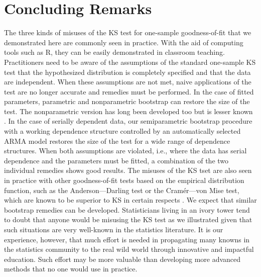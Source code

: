 \documentclass[12pt, letterpaper]{article}
\begin{document}
\section{Concluding Remarks}
\label{sec:conclusion}

The three kinds of misuses of the KS test for one-sample goodness-of-fit that we
demonstrated here are commonly seen in practice. With the aid of computing tools
such as R, they can be easily demonstrated in classroom teaching. Practitioners
need to be aware of the assumptions of the standard one-sample KS test that the
hypothesized distribution is completely specified and that the data are
independent. When these assumptions are not met, naive applications of the test
are no longer accurate and remedies must be performed. In the
case of fitted parameters, parametric and nonparametric bootstrap can restore
the size of the test. The nonparametric version has long been developed too but
is lesser known \citep{babu2004goodness}. In the case of serially dependent data,
our semiparametric bootstrap procedure with a working dependence structure
controlled by an automatically selected ARMA model restores the size of the test
for a wide range of dependence structures.
When both assumptions are violated, i.e., where the data has serial 
dependence and the parameters must be fitted, a combination of the two
individual remedies shows good results. The misuses of the KS tset are also seen
in practice with other goodness-of-fit tests based on the empirical distribution
function, such as the Anderson—Darling test or the Cramér—von Mise test, which
are known to be superior to KS in certain respects \citep{stephens2017tests}. We
expect that similar bootstrap remedies can be developed. Statisticians living in
an ivory tower tend to doubt that anyone would be misusing the KS test as we
illustrated given that such situations are very well-known in the statistics
literature. It is our experience, however, that much effort is needed in
propagating many knowns in the statistics community to the real wild world
through innovative and impactful education. Such effort may be more valuable
than developing more advanced methods that no one would use in practice.
\end{document}
